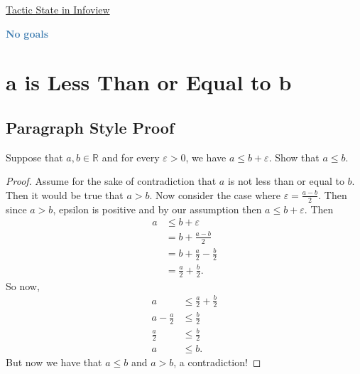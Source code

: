 \documentclass[
  letterpaper,
]{scrreprt}
\newenvironment{Shaded}{\begin{snugshade}}{\end{snugshade}}
\newcommand{\InformationTok}[1]{\textcolor[rgb]{0.37,0.37,0.37}{#1}}
\newcommand{\SpecialStringTok}[1]{\textcolor[rgb]{0.13,0.47,0.30}{#1}}
\renewcommand{\InformationTok}[1]{\textcolor[HTML]{D2691E}{\textbf{#1}}}
\renewcommand{\SpecialStringTok}[1]{\textcolor[HTML]{4682B4}{\textbf{#1}}}
\newcommand{\nobreakShaded}{\renewenvironment{Shaded}
	{\begin{tcolorbox}[frame hidden, enhanced, interior hidden, boxrule=0pt,
		borderline west={3pt}{0pt}{shadecolor}, sharp corners]}
	{\end{tcolorbox}}}
\newenvironment{outpt}
	{\nobreakShaded\begin{minipage}[t]{0.32\textwidth}
		\uline{Tactic State in Infoview}}
	{\end{minipage}}
\newcommand{\excl}[1]{}
\theoremstyle{remark}
\begin{document}
\begin{outpt}

\begin{Shaded}
\begin{Highlighting}[]
\SpecialStringTok{No}\InformationTok{ }\SpecialStringTok{goals}
\end{Highlighting}
\end{Shaded}

\end{outpt}

\hypertarget{a-is-less-than-or-equal-to-b}{%
\section{a is Less Than or Equal to
b}\label{a-is-less-than-or-equal-to-b}}

\hypertarget{paragraph-style-proof-1}{%
\subsection{Paragraph Style Proof}\label{paragraph-style-proof-1}}

\begin{thm}
Suppose that \(a, b \in \mathbb{R}\) and for every \(\varepsilon > 0\),
we have \(a \le b + \varepsilon\). Show that \(a \le b\).

\end{thm}

\begin{proof}

Assume for the sake of contradiction that \(a\) is not less than or
equal to \(b\). Then it would be true that \(a > b\). Now consider the
case where \(\varepsilon = \frac{a - b}{2}.\) Then since \(a > b\),
epsilon is positive and by our assumption then
\(a \le b + \varepsilon\). Then \begin{align*}
a & \le b + \varepsilon \\
& = b + \frac{a - b}{2} \\
& = b + \frac{a}{2} - \frac{b}{2} \\
& = \frac{a}{2} + \frac{b}{2}. 
\end{align*} So now, \begin{align*}
a & \le \frac{a}{2} + \frac{b}{2} \\
a - \frac{a}{2} & \le \frac{b}{2} \\
\frac{a}{2} & \le \frac{b}{2} \\
a & \le b.
\end{align*} But now we have that \(a \le b\) and \(a > b\), a
contradiction! \excl{~□}\qedhere

\end{proof}
\end{document}
